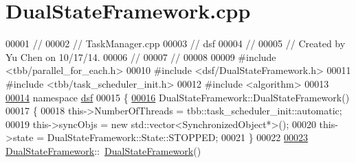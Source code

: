 \hypertarget{_dual_state_framework_8cpp_source}{}\section{Dual\+State\+Framework.\+cpp}
\label{_dual_state_framework_8cpp_source}

\begin{DoxyCode}
00001 \textcolor{comment}{//}
00002 \textcolor{comment}{//  TaskManager.cpp}
00003 \textcolor{comment}{//  dsf}
00004 \textcolor{comment}{//}
00005 \textcolor{comment}{//  Created by Yu Chen on 10/17/14.}
00006 \textcolor{comment}{//}
00007 \textcolor{comment}{//}
00008 
00009 \textcolor{preprocessor}{#}\textcolor{preprocessor}{include} \textcolor{preprocessor}{<}\textcolor{preprocessor}{tbb}\textcolor{preprocessor}{/}\textcolor{preprocessor}{parallel\_for\_each}\textcolor{preprocessor}{.}\textcolor{preprocessor}{h}\textcolor{preprocessor}{>}
00010 \textcolor{preprocessor}{#}\textcolor{preprocessor}{include} \textcolor{preprocessor}{<}\textcolor{preprocessor}{dsf}\textcolor{preprocessor}{/}\textcolor{preprocessor}{DualStateFramework}\textcolor{preprocessor}{.}\textcolor{preprocessor}{h}\textcolor{preprocessor}{>}
00011 \textcolor{preprocessor}{#}\textcolor{preprocessor}{include} \textcolor{preprocessor}{<}\textcolor{preprocessor}{tbb}\textcolor{preprocessor}{/}\textcolor{preprocessor}{task\_scheduler\_init}\textcolor{preprocessor}{.}\textcolor{preprocessor}{h}\textcolor{preprocessor}{>}
00012 \textcolor{preprocessor}{#}\textcolor{preprocessor}{include} \textcolor{preprocessor}{<}\textcolor{preprocessor}{algorithm}\textcolor{preprocessor}{>}
00013 
\hypertarget{_dual_state_framework_8cpp_source_l00014}{}\hyperlink{namespacedsf}{00014} \textcolor{keyword}{namespace} \hyperlink{namespacedsf_aa16e735f29587f4485b56fc46746f7a9}{dsf}
00015 \{
\hypertarget{_dual_state_framework_8cpp_source_l00016}{}\hyperlink{classdsf_1_1_dual_state_framework_ab2c3f064dee1876d92694544d032b942}{00016}     DualStateFramework::DualStateFramework()
00017     \{
00018         \textcolor{keyword}{this}->NumberOfThreads = tbb::task\_scheduler\_init::automatic;
00019         \textcolor{keyword}{this}->syncObjs = \textcolor{keyword}{new} std::vector<SynchronizedObject*>();
00020         \textcolor{keyword}{this}->state = DualStateFramework::State::STOPPED;
00021     \}
00022 
\hypertarget{_dual_state_framework_8cpp_source_l00023}{}\hyperlink{classdsf_1_1_dual_state_framework_a0e5246056c73a684d0a167f3ed6d1fb1}{00023}     \hyperlink{namespacedsf_aa16e735f29587f4485b56fc46746f7a9}{DualStateFramework}::~\hyperlink{namespacedsf_aa16e735f29587f4485b56fc46746f7a9}{DualStateFramework}()

\end{DoxyCode}
